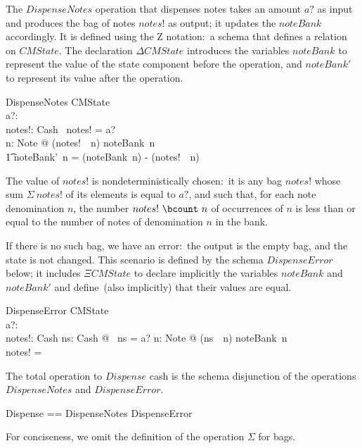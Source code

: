\documentclass{article}
\begin{document}
The $DispenseNotes$ operation that dispenses notes takes an amount
$a?$ as input and produces the bag of notes $notes!$ as output; it
updates the $noteBank$ accordingly.  It is defined using the Z
notation:~a schema that defines a relation on $CMState$. The
declaration $\Delta CMState$ introduces the variables $noteBank$ to
represent the value of the state component before the operation, and
$noteBank'$ to represent its value after the operation.
\begin{schema}{DispenseNotes}
  \Delta CMState
  \\ %
  a?: \nat
  \\ %
  notes!: Cash
\where
  \Sigma~notes! = a?
  \\ %
  \forall n: Note @ (notes!~\bcount~n) \leq noteBank~n
  \\ %
  \t1 \land %
  noteBank'~n = (noteBank~n) - (notes!~\bcount~n)
\end{schema}
The value of $notes!$ is nondeterministically chosen:~it is any bag
$notes!$ whose sum $\Sigma~notes!$ of its elements is equal to $a?$,
and such that, for each note denomination $n$, the number
$notes!~\bcount~n$ of occurrences of $n$ is less than or equal to the
number of notes of denomination $n$ in the bank.

If there is no such bag, we have an error:~the output is the empty
bag, and the state is not changed.  This scenario is defined by the
schema $DispenseError$ below; it includes $\Xi CMState$ to declare
implicitly the variables $noteBank$ and $noteBank'$ and define~(also
implicitly) that their values are equal.
\begin{schema}{DispenseError}
  \Xi CMState
  \\ %
  a?: \nat
  \\ %
  notes!: Cash
\where
  \lnot \exists ns: Cash @
  \Sigma~ns = a? \land
  \forall n: Note @ (ns~\bcount~n) \leq noteBank~n
  \\ %
  notes! = \lbag ~\rbag
\end{schema}
The total operation to $Dispense$ cash is the schema disjunction of
the operations $DispenseNotes$ and $DispenseError$.
\begin{zed}
  Dispense == DispenseNotes \lor DispenseError
\end{zed}
For conciseness, we omit the definition of the operation $\Sigma$ for
bags.
\end{document}
